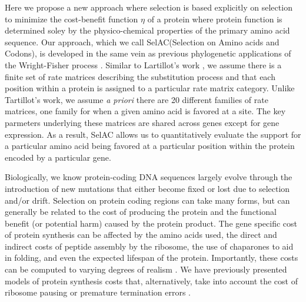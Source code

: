 \documentclass[12pt,letterpaper]{article}
\newcommand{\PC}{physico-chemical\xspace}
\newcommand{\selac}{SelAC\xspace}
\begin{document}
Here we propose a new approach where selection is based explicitly on selection to minimize the cost-benefit function $\eta$ of a protein where protein function is determined soley by the \PC properties of the primary amino acid sequence.
Our approach, which we call \selac (Selection on Amino acids and Codons), is developed in the same vein as previous phylogenetic applications of the Wright-Fisher process \citep[e.g.~][]{MuseAndGaut1994,HalpernAndBruno1998,YangAndNielsen2008,RodrigueEtAl2005,KoshiAndGoldstein1997,KoshiEtAl1999,DimmicEtAl2000,ThorneEtAl2012,LartillotAndPhilippe2004,RodrigueAndLartillot2014}.
Similar to Lartillot's work \citep{LartillotAndPhilippe2004,RodrigueAndLartillot2014}, we assume there is a finite set of rate matrices describing the substitution process and that each position within a protein is assigned to a particular rate matrix category.
Unlike Tartillot's work, we assume \emph{a priori} there are 20 different families of rate matrices, one family for when a given amino acid is favored at a site.
The key parmeters underlying these matrices are shared across genes except for gene expression.
As a result, \selac allows us to quantitatively evaluate the support for a particular amino acid being favored at a particular position within the protein encoded by a particular gene.

Biologically, we know protein-coding DNA sequences largely evolve through the introduction of new mutations that either become fixed or lost due to selection and/or drift.
Selection on protein coding regions can take many forms, but can generally be related to the cost of producing the protein and the functional benefit (or potential harm) caused by the protein product.
The gene specific cost of protein synthesis can be affected by the amino acids used, the direct and indirect costs of peptide assembly by the ribosome, the use of chaparones to aid in folding, and even the expected lifespan of the protein.
Importantly, these costs can be computed to varying degrees of realism \citep[e.g.][]{Wagner2005,LynchAndMarinov2015}.
We have previously presented models of protein synthesis costs that, alternatively, take into account the cost of ribosome pausing \citep{ShahAndGilchrist2011} or premature termination errors \citep{GilchristAndWagner2006,Gilchrist2007,GilchristEtAl2009}.
\end{document}
